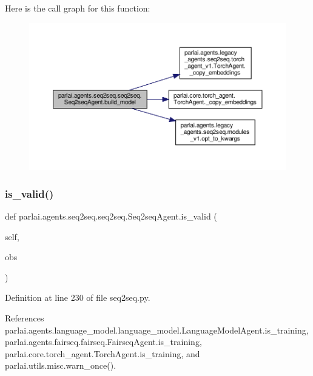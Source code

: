 Here is the call graph for this function\+:
\nopagebreak
\begin{figure}[H]
\begin{center}
\leavevmode
\includegraphics[width=350pt]{classparlai_1_1agents_1_1seq2seq_1_1seq2seq_1_1Seq2seqAgent_a43422bdf284bfc06a9bd2db434a7167c_cgraph}
\end{center}
\end{figure}
\mbox{\label{classparlai_1_1agents_1_1seq2seq_1_1seq2seq_1_1Seq2seqAgent_a6fbfdde4ec69ec4050fa4005c6608f1a}} 
\subsubsection{\texorpdfstring{is\+\_\+valid()}{is\_valid()}}
{\footnotesize\ttfamily def parlai.\+agents.\+seq2seq.\+seq2seq.\+Seq2seq\+Agent.\+is\+\_\+valid (\begin{DoxyParamCaption}\item[{}]{self,  }\item[{}]{obs }\end{DoxyParamCaption})}



Definition at line 230 of file seq2seq.\+py.



References parlai.\+agents.\+language\+\_\+model.\+language\+\_\+model.\+Language\+Model\+Agent.\+is\+\_\+training, parlai.\+agents.\+fairseq.\+fairseq.\+Fairseq\+Agent.\+is\+\_\+training, parlai.\+core.\+torch\+\_\+agent.\+Torch\+Agent.\+is\+\_\+training, and parlai.\+utils.\+misc.\+warn\+\_\+once().



